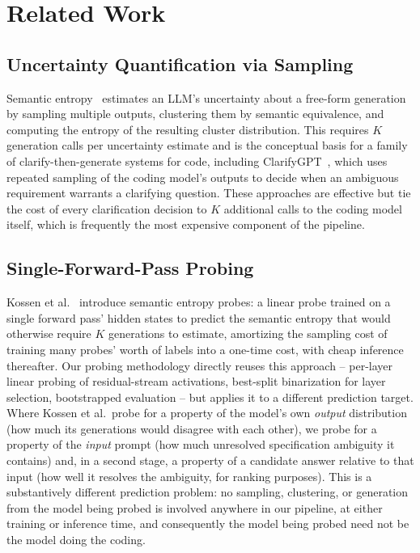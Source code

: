 \section{Related Work}
\label{sec:related}

\subsection{Uncertainty Quantification via Sampling}

Semantic entropy~\cite{kuhn2023semantic} estimates an LLM's uncertainty
about a free-form generation by sampling multiple outputs, clustering them
by semantic equivalence, and computing the entropy of the resulting cluster
distribution. This requires $K$ generation calls per uncertainty estimate
and is the conceptual basis for a family of clarify-then-generate systems
for code, including ClarifyGPT~\cite{clarifygpt}, which uses repeated
sampling of the coding model's outputs to decide when an ambiguous
requirement warrants a clarifying question. These approaches are effective
but tie the cost of every clarification decision to $K$ additional calls to
the coding model itself, which is frequently the most expensive component
of the pipeline.

\subsection{Single-Forward-Pass Probing}

Kossen et al.~\cite{oatml_sep} introduce semantic entropy probes: a linear
probe trained on a single forward pass' hidden states to predict the
semantic entropy that would otherwise require $K$ generations to estimate,
amortizing the sampling cost of training many probes' worth of labels into
a one-time cost, with cheap inference thereafter. Our probing methodology
directly reuses this approach -- per-layer linear probing of residual-stream
activations, best-split binarization for layer selection, bootstrapped
evaluation -- but applies it to a different prediction target. Where
Kossen et al.\ probe for a property of the model's own \emph{output}
distribution (how much its generations would disagree with each other), we
probe for a property of the \emph{input} prompt (how much unresolved
specification ambiguity it contains) and, in a second stage, a property of
a candidate answer relative to that input (how well it resolves the
ambiguity, for ranking purposes). This is a substantively different
prediction problem: no sampling, clustering, or generation from the model
being probed is involved anywhere in our pipeline, at either training or
inference time, and consequently the model being probed need not be the
model doing the coding.

